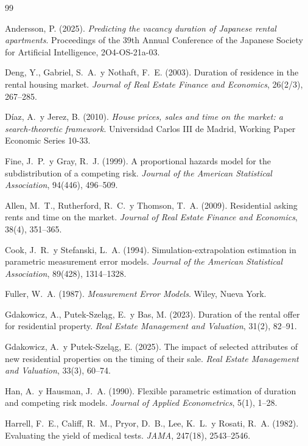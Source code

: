 \documentclass[11pt,a4paper]{article}
\theoremstyle{definition}
\begin{document}
\begin{thebibliography}{99}

Andersson, P. (2025).
\emph{Predicting the vacancy duration of Japanese rental apartments}.
Proceedings of the 39th Annual Conference of the Japanese Society for Artificial
Intelligence, 2O4-OS-21a-03.

Deng, Y., Gabriel, S.\ A.\ y Nothaft, F.\ E. (2003).
Duration of residence in the rental housing market.
\emph{Journal of Real Estate Finance and Economics}, 26(2/3), 267--285.

Díaz, A.\ y Jerez, B. (2010).
\emph{House prices, sales and time on the market: a search-theoretic framework}.
Universidad Carlos III de Madrid, Working Paper Economic Series 10-33.

Fine, J.\ P.\ y Gray, R.\ J. (1999).
A proportional hazards model for the subdistribution of a competing risk.
\emph{Journal of the American Statistical Association}, 94(446), 496--509.

Allen, M.\ T., Rutherford, R.\ C.\ y Thomson, T.\ A. (2009).
Residential asking rents and time on the market.
\emph{Journal of Real Estate Finance and Economics}, 38(4), 351--365.

Cook, J.\ R.\ y Stefanski, L.\ A. (1994).
Simulation-extrapolation estimation in parametric measurement error models.
\emph{Journal of the American Statistical Association}, 89(428), 1314--1328.

Fuller, W.\ A. (1987).
\emph{Measurement Error Models}. Wiley, Nueva York.

Gdakowicz, A., Putek-Szeląg, E.\ y Bas, M. (2023).
Duration of the rental offer for residential property.
\emph{Real Estate Management and Valuation}, 31(2), 82--91.

Gdakowicz, A.\ y Putek-Szeląg, E. (2025).
The impact of selected attributes of new residential properties on the timing of
their sale.
\emph{Real Estate Management and Valuation}, 33(3), 60--74.

Han, A.\ y Hausman, J.\ A. (1990).
Flexible parametric estimation of duration and competing risk models.
\emph{Journal of Applied Econometrics}, 5(1), 1--28.

Harrell, F.\ E., Califf, R.\ M., Pryor, D.\ B., Lee, K.\ L.\ y Rosati, R.\ A. (1982).
Evaluating the yield of medical tests.
\emph{JAMA}, 247(18), 2543--2546.


\end{thebibliography}
\end{document}
